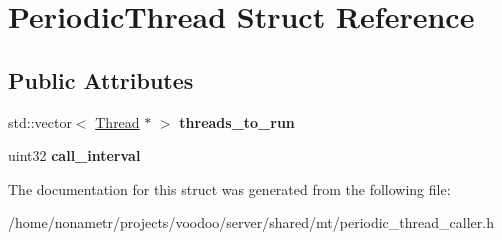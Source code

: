 \hypertarget{structPeriodicThread}{\section{\-Periodic\-Thread \-Struct \-Reference}
\label{structPeriodicThread}
}
\subsection*{\-Public \-Attributes}
\begin{DoxyCompactItemize}
\item 
\hypertarget{structPeriodicThread_acede129e7cdac21b9c693663ecd8cce8}{std\-::vector$<$ \hyperlink{classThread}{\-Thread} $\ast$ $>$ {\bfseries threads\-\_\-to\-\_\-run}}\label{structPeriodicThread_acede129e7cdac21b9c693663ecd8cce8}

\item 
\hypertarget{structPeriodicThread_a03acceee3ba245b9dd88a0fdd00c198f}{uint32 {\bfseries call\-\_\-interval}}\label{structPeriodicThread_a03acceee3ba245b9dd88a0fdd00c198f}

\end{DoxyCompactItemize}


\-The documentation for this struct was generated from the following file\-:\begin{DoxyCompactItemize}
\item 
/home/nonametr/projects/voodoo/server/shared/mt/periodic\-\_\-thread\-\_\-caller.\-h\end{DoxyCompactItemize}
